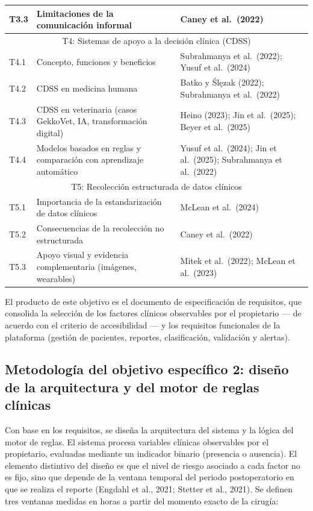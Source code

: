 \documentclass[stu, spanish]{apa7}
\begin{document}
\begin{longtable}{@{}lp{4.5cm}p{6.5cm}@{}}
T3.3 & Limitaciones de la comunicaci\'{o}n informal & Caney et al.\ (2022) \\
\midrule
\multicolumn{3}{c}{T4: Sistemas de apoyo a la decisi\'{o}n cl\'{i}nica (CDSS)} \\
\midrule
T4.1 & Concepto, funciones y beneficios & Subrahmanya et al.\ (2022); Yusuf et al.\ (2024) \\
T4.2 & CDSS en medicina humana & Batko y \'{S}l\k{e}zak (2022); Subrahmanya et al.\ (2022) \\
T4.3 & CDSS en veterinaria (casos GekkoVet, IA, transformaci\'{o}n digital) & Heino (2023); Jin et al.\ (2025); Beyer et al.\ (2025) \\
T4.4 & Modelos basados en reglas y comparaci\'{o}n con aprendizaje autom\'{a}tico & Yusuf et al.\ (2024); Jin et al.\ (2025); Subrahmanya et al.\ (2022) \\
\midrule
\multicolumn{3}{c}{T5: Recolecci\'{o}n estructurada de datos cl\'{i}nicos} \\
\midrule
T5.1 & Importancia de la estandarizaci\'{o}n de datos cl\'{i}nicos & McLean et al.\ (2024) \\
T5.2 & Consecuencias de la recolecci\'{o}n no estructurada & Caney et al.\ (2022) \\
T5.3 & Apoyo visual y evidencia complementaria (im\'{a}genes, wearables) & Mitek et al.\ (2022); McLean et al.\ (2023) \\
\end{longtable}

El producto de este objetivo es el documento de especificaci\'{o}n de requisitos, que consolida la selecci\'{o}n de los factores cl\'{i}nicos observables por el propietario --- de acuerdo con el criterio de accesibilidad --- y los requisitos funcionales de la plataforma (gesti\'{o}n de pacientes, reportes, clasificaci\'{o}n, validaci\'{o}n y alertas).

\subsection{Metodolog\'{i}a del objetivo espec\'{i}fico 2: dise\~{n}o de la arquitectura y del motor de reglas cl\'{i}nicas}
Con base en los requisitos, se dise\~{n}a la arquitectura del sistema y la l\'{o}gica del motor de reglas. El sistema procesa variables cl\'{i}nicas observables por el propietario, evaluadas mediante un indicador binario (presencia o ausencia). El elemento distintivo del dise\~{n}o es que el nivel de riesgo asociado a cada factor no es fijo, sino que depende de la ventana temporal del periodo postoperatorio en que se realiza el reporte (Engdahl et al., 2021; Stetter et al., 2021). Se definen tres ventanas medidas en horas a partir del momento exacto de la cirug\'{i}a:
\end{document}
